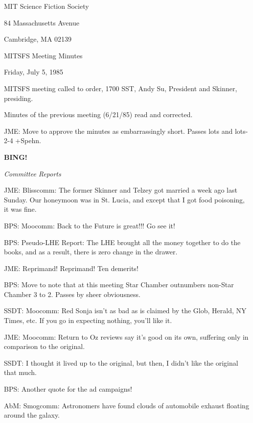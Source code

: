\documentclass[12pt]{article}
\newcommand{\bing}{{\bf BING!} }
\newcommand{\goto}[1]{\bing \vskip 12pt \centerline{{\em{#1}}}}
\begin{document}
\begin{center}

MIT Science Fiction Society 

84 Massachusetts Avenue

Cambridge, MA 02139

\vspace{12pt}

MITSFS Meeting Minutes 

Friday, July 5, 1985

\end{center}
 
\vspace{18pt}

\setlength{\parskip}{6pt}

\noindent
MITSFS meeting called to order, 1700 SST,
Andy Su, President and Skinner, presiding.

Minutes of the previous meeting (6/21/85) read and corrected.

JME: Move to approve the minutes as embarrassingly short. Passes lots and lots-2-4 +Spehn.

\goto{Committee Reports}

JME: Blisscomm: The former Skinner and Telzey got married a week ago last Sunday. Our honeymoon was in St. Lucia, and except that I got food poisoning, it was fine.

BPS: Moocomm: Back to the Future is great!!! Go see it!

BPS: Pseudo-LHE Report: The LHE brought all the money together to do the books, and as a result, there is zero change in the drawer.

JME: Reprimand! Reprimand! Ten demerits!

BPS: Move to note that at this meeting Star Chamber outnumbers non-Star Chamber 3 to 2. Passes by sheer obviousness.

SSDT: Moocomm: Red Sonja isn't as bad as is claimed by the Glob, Herald, NY Times, etc. If you go in expecting nothing, you'll like it.

JME: Moocomm: Return to Oz reviews say it's good on its own, suffering only in comparison to the original.

SSDT: I thought it lived up to the original, but then, I didn't like the original that much.

BPS: Another quote for the ad campaigns!

AbM: Smogcomm: Astronomers have found clouds of automobile exhaust floating around the galaxy.
\end{document}
